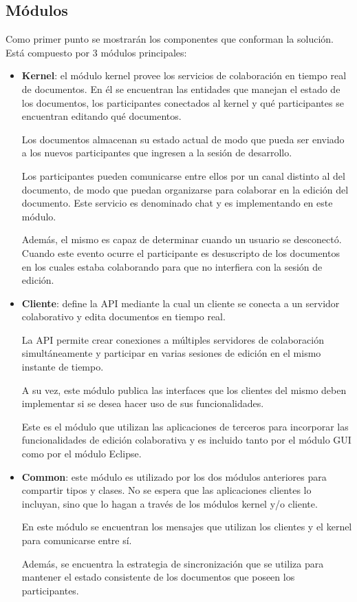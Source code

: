 \documentclass[12pt,a4paper]{article}
\begin{document}
\subsection{Módulos}

Como primer punto se mostrarán los componentes que conforman la solución. Está compuesto por 3 módulos principales:

\begin{itemize}
	\item \textbf{Kernel}: el módulo kernel provee los servicios de colaboración en tiempo real de documentos. En él
	se encuentran las entidades que manejan el estado de los documentos, los participantes conectados al kernel y
	qué participantes se encuentran editando qué documentos.
	
	Los documentos almacenan su estado actual de modo que pueda ser enviado a los nuevos participantes que ingresen
	a la sesión de desarrollo.
	
	Los participantes pueden comunicarse entre ellos por un canal distinto al del documento, de modo que puedan
	organizarse	para colaborar en la edición del documento. Este servicio es denominado chat y es implementando en este módulo.
	
	Además, el mismo es capaz de determinar cuando un usuario se desconectó. Cuando este evento ocurre
	el participante es desuscripto de los documentos en los cuales estaba colaborando para que no interfiera
	con la sesión de edición.
	
	\item \textbf{Cliente}: define la API mediante la cual un cliente se conecta a un servidor colaborativo 
	y edita documentos en tiempo real. 

	La API permite crear conexiones a múltiples servidores de colaboración simultáneamente y participar
	en varias sesiones de edición en el mismo instante de tiempo.
	
	A su vez, este módulo publica las interfaces que los clientes del mismo deben implementar si se
	desea hacer uso de sus funcionalidades.
	
	Este es el módulo que utilizan las aplicaciones de terceros para incorporar las funcionalidades
	de edición colaborativa y es incluido tanto por el módulo GUI como por el módulo Eclipse.

	\item \textbf{Common}: este módulo es utilizado por los dos módulos anteriores para compartir tipos
	y clases. No se espera que las aplicaciones clientes lo incluyan, sino que lo hagan
	a través de los módulos kernel y/o cliente.
	
	En este módulo se encuentran los mensajes que utilizan los clientes y el kernel para comunicarse entre sí.
	
	Además, se encuentra la estrategia de sincronización que se utiliza para mantener el estado consistente
	de los documentos que poseen los participantes.
\end{itemize}
\end{document}
